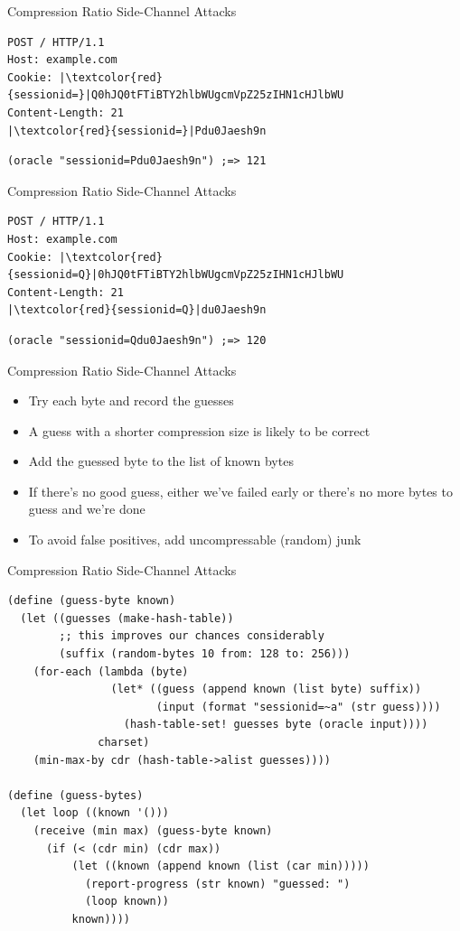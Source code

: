 \documentclass[presentation]{beamer}
\begin{document}
\begin{frame}[fragile,label=sec-2-32]{Compression Ratio Side-Channel Attacks}
 \begin{verbatim}
POST / HTTP/1.1
Host: example.com
Cookie: |\textcolor{red}{sessionid=}|Q0hJQ0tFTiBTY2hlbWUgcmVpZ25zIHN1cHJlbWU
Content-Length: 21
|\textcolor{red}{sessionid=}|Pdu0Jaesh9n
\end{verbatim}

\begin{verbatim}
(oracle "sessionid=Pdu0Jaesh9n") ;=> 121
\end{verbatim}
\end{frame}

\begin{frame}[fragile,label=sec-2-33]{Compression Ratio Side-Channel Attacks}
 \begin{verbatim}
POST / HTTP/1.1
Host: example.com
Cookie: |\textcolor{red}{sessionid=Q}|0hJQ0tFTiBTY2hlbWUgcmVpZ25zIHN1cHJlbWU
Content-Length: 21
|\textcolor{red}{sessionid=Q}|du0Jaesh9n
\end{verbatim}

\begin{verbatim}
(oracle "sessionid=Qdu0Jaesh9n") ;=> 120
\end{verbatim}
\end{frame}

\begin{frame}[label=sec-2-34]{Compression Ratio Side-Channel Attacks}
\begin{itemize}
\item Try each byte and record the guesses
\item A guess with a shorter compression size is likely to be correct
\item Add the guessed byte to the list of known bytes
\item If there's no good guess, either we've failed early or there's no
more bytes to guess and we're done
\item To avoid false positives, add uncompressable (random) junk
\end{itemize}
\end{frame}

\begin{frame}[fragile,label=sec-2-35]{Compression Ratio Side-Channel Attacks}
 \begin{verbatim}
(define (guess-byte known)
  (let ((guesses (make-hash-table))
        ;; this improves our chances considerably
        (suffix (random-bytes 10 from: 128 to: 256)))
    (for-each (lambda (byte)
                (let* ((guess (append known (list byte) suffix))
                       (input (format "sessionid=~a" (str guess))))
                  (hash-table-set! guesses byte (oracle input))))
              charset)
    (min-max-by cdr (hash-table->alist guesses))))

(define (guess-bytes)
  (let loop ((known '()))
    (receive (min max) (guess-byte known)
      (if (< (cdr min) (cdr max))
          (let ((known (append known (list (car min)))))
            (report-progress (str known) "guessed: ")
            (loop known))
          known))))
\end{verbatim}
\end{frame}
\end{document}
